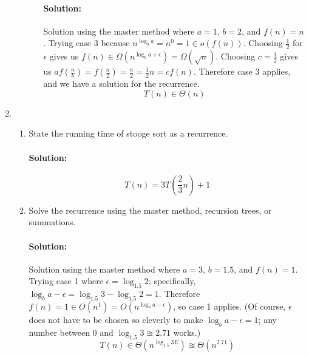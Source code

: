 \documentclass{article}
\begin{document}
\begin{enumerate}
\begin{enumerate}
\begin{enumerate}
      \paragraph{Solution:} Solution using the master method where
      \(a=1\), \(b=2\), and \(f(n)=n\).  Trying case 3 because
      \(n^{\log_b a} = n^0 = 1 \in o(f(n))\).  Choosing \(\frac{1}{2}\) for
      \(\epsilon\) gives us
      \(f(n) \in \Omega(n^{\log_b a + \epsilon}) = \Omega(\sqrt{n})\).  Choosing
      \(c=\frac{1}{2}\) gives us
      \(af(\frac{n}{b})=f(\frac{n}{2})=\frac{n}{2}=\frac{1}{2}n=cf(n)\).
      Therefore case 3 applies, and we have a solution for the recurrence.
      \[T(n) \in \Theta(n)\]


    \end{enumerate}
  \end{enumerate}

  \pagebreak[2]
\item
  \begin{enumerate}
    \addtocounter{enumii}{1}
  \item State the running time of stooge sort as a recurrence.
    \paragraph{Solution:} \[T(n)=3T(\frac{2}{3}n)+1\]

    \newpage
  \item Solve the recurrence using the master method, recursion trees, or
    summations.
    \paragraph{Solution:} Solution using the master method where
    \(a=3\), \(b=1.5\), and \(f(n)=1\).  Trying case 1 where
    \(\epsilon = \log_{1.5} 2\); specifically,
    \(\log_b a - \epsilon = \log_{1.5} 3 - \log_{1.5} 2 = 1\).  Therefore
    \(f(n) = 1 \in O(n^1) = O(n^{\log_b a - \epsilon})\), so case 1 applies.
    (Of course, \(\epsilon\) does not have to be chosen so cleverly to make
    \(\log_b a - \epsilon = 1\); any number between 0 and
    \(\log_{1.5} 3 \approxeq 2.71\) works.)
    \[T(n) \in \Theta(n^{\log_{1.5} 3E}) \approxeq \Theta(n^{2.71})\]
  \end{enumerate}


\end{enumerate}
\end{document}
